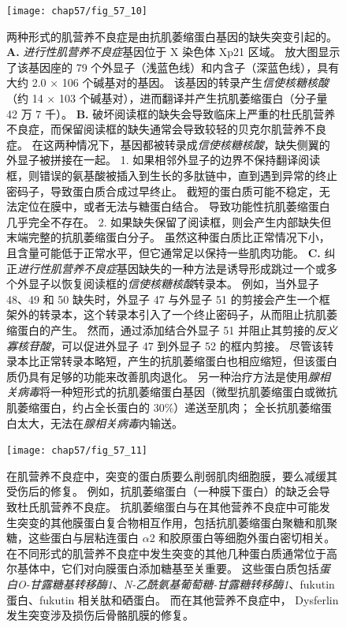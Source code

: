 \begin{figure}[htbp]
	\centering
	\texttt{[image: chap57/fig\_57\_10]}
	\caption{两种形式的肌营养不良症是由抗肌萎缩蛋白基因的缺失突变引起的\cite{hoffman1987dystrophin}。
		\textbf{A.} \textit{进行性肌营养不良症}基因位于 X 染色体 Xp21 区域。
		放大图显示了该基因座的 79 个外显子（浅蓝色线）和内含子（深蓝色线），具有大约 2.0 × 106 个碱基对的基因。
		该基因的转录产生\textit{信使核糖核酸}（约 14 × 103 个碱基对），进而翻译并产生抗肌萎缩蛋白（分子量 42 万 7 千）。
		\textbf{B.} 破坏阅读框的缺失会导致临床上严重的杜氏肌营养不良症，而保留阅读框的缺失通常会导致较轻的贝克尔肌营养不良症。
		在这两种情况下，基因都被转录成\textit{信使核糖核酸}，缺失侧翼的外显子被拼接在一起。
		1. 如果相邻外显子的边界不保持翻译阅读框，则错误的氨基酸被插入到生长的多肽链中，直到遇到异常的终止密码子，导致蛋白质合成过早终止。
		截短的蛋白质可能不稳定，无法定位在膜中，或者无法与糖蛋白结合。
		导致功能性抗肌萎缩蛋白几乎完全不存在。
		2. 如果缺失保留了阅读框，则会产生内部缺失但末端完整的抗肌萎缩蛋白分子。
		虽然这种蛋白质比正常情况下小，且含量可能低于正常水平，但它通常足以保持一些肌肉功能。
		\textbf{C.} 纠正\textit{进行性肌营养不良症}基因缺失的一种方法是诱导形成跳过一个或多个外显子以恢复阅读框的\textit{信使核糖核酸}转录本。
		例如，当外显子 48、49 和 50 缺失时，外显子 47 与外显子 51 的剪接会产生一个框架外的转录本，这个转录本引入了一个终止密码子，从而阻止抗肌萎缩蛋白的产生。
		然而，通过添加结合外显子 51 并阻止其剪接的\textit{反义寡核苷酸}，可以促进外显子 47 到外显子 52 的框内剪接。
		尽管该转录本比正常转录本略短，产生的抗肌萎缩蛋白也相应缩短，但该蛋白质仍具有足够的功能来改善肌肉退化。
		另一种治疗方法是使用\textit{腺相关病毒}将一种短形式的抗肌萎缩蛋白基因（微型抗肌萎缩蛋白或微抗肌萎缩蛋白，约占全长蛋白的 30\%）递送至肌肉；
		全长抗肌萎缩蛋白太大，无法在\textit{腺相关病毒}内输送。}
	\label{fig:57_10}
\end{figure}


\begin{figure}[htbp]
	\centering
	\texttt{[image: chap57/fig\_57\_11]}
	\caption{在肌营养不良症中，突变的蛋白质要么削弱肌肉细胞膜，要么减缓其受伤后的修复。
		例如，抗肌萎缩蛋白（一种膜下蛋白）的缺乏会导致杜氏肌营养不良症。
		抗肌萎缩蛋白与在其他营养不良症中可能发生突变的其他膜蛋白复合物相互作用，包括抗肌萎缩蛋白聚糖和肌聚糖，这些蛋白与层粘连蛋白 $\alpha$2 和胶原蛋白等细胞外蛋白密切相关。
		在不同形式的肌营养不良症中发生突变的其他几种蛋白质通常位于高尔基体中，它们对向膜蛋白添加糖基至关重要。
		这些蛋白质包括\textit{蛋白O-甘露糖基转移酶1}、\textit{N-乙酰氨基葡萄糖-甘露糖转移酶1}、fukutin蛋白、fukutin 相关肽和硒蛋白。
		而在其他营养不良症中， Dysferlin发生突变涉及损伤后骨骼肌膜的修复\cite{brown2005harrison}。}
	\label{fig:57_11}
\end{figure}


